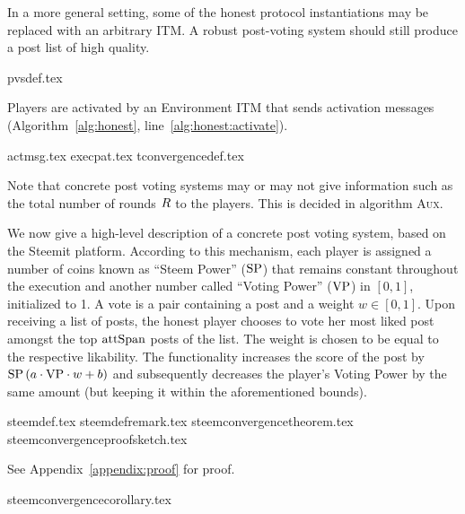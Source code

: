     In a more general setting, some of the honest protocol instantiations may be
    replaced with an arbitrary ITM. A robust post-voting system should still
    produce a post list of high quality.

    {pvsdef.tex}

    \noindent Players are activated by an Environment ITM that sends activation
    messages (Algorithm~\ref{alg:honest}, line~\ref{alg:honest:activate}).

    {actmsg.tex}
    {execpat.tex}
    {tconvergencedef.tex}

    \noindent Note that concrete post voting systems may or may not give
    information such as the total number of rounds $R$ to the players.
    This is decided in algorithm \textsc{Aux}.

    We now give a high-level description of a concrete post voting system, based
    on the Steemit platform. According to this mechanism, each player is
    assigned a number of coins known as ``Steem Power'' ($\mathrm{SP}$) that remains
    constant throughout the execution and another number called ``Voting Power''
    ($\mathrm{VP}$) in $\left[0, 1\right]$, initialized to 1. A vote is a pair
    containing a post and a weight $w \in \left[0, 1\right]$. Upon receiving a
    list of posts, the honest player chooses to vote her most liked post amongst
    the top $\mathrm{attSpan}$ posts of the list. The weight is chosen to be equal to
    the respective likability. The functionality increases the score of the post
    by $\mathrm{SP}\left(a \cdot \mathrm{VP} \cdot w + b\right)$ and subsequently
    decreases the player's Voting Power by the same amount (but keeping it
    within the aforementioned bounds).

    {steemdef.tex}
    {steemdefremark.tex}
    {steemconvergencetheorem.tex}
    {steemconvergenceproofsketch.tex}

    See Appendix~\ref{appendix:proof} for proof.

    {steemconvergencecorollary.tex}
